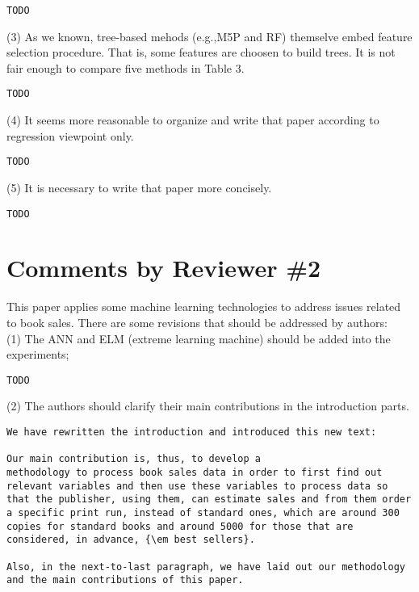 \documentclass[preprint]{elsarticle}
\begin{document}
\begin{verbatim}
TODO
\end{verbatim}

\noindent (3) As we known, tree-based mehods (e.g.,M5P and RF) themselve embed feature selection procedure. That is, some features are choosen to build trees. It is not fair enough to compare five methods in Table 3. \\

\begin{verbatim}
TODO
\end{verbatim}

\noindent (4) It seems more reasonable to organize and write that paper according to regression viewpoint only.\\

\begin{verbatim}
TODO
\end{verbatim}

\noindent (5) It is necessary to write that paper more concisely.\\

\begin{verbatim}
TODO
\end{verbatim}



\section{Comments by Reviewer \#2}

\noindent This paper applies some machine learning technologies to address issues related to book sales. There are some revisions that should be addressed by authors:\\


\noindent (1) The ANN and ELM (extreme learning machine) should be added into the experiments;\\

\begin{verbatim}
TODO
\end{verbatim}


\noindent (2) The authors should clarify their main contributions in the introduction parts.\\

\begin{verbatim}
We have rewritten the introduction and introduced this new text:

Our main contribution is, thus, to develop a
methodology to process book sales data in order to first find out
relevant variables and then use these variables to process data so
that the publisher, using them, can estimate sales and from them order
a specific print run, instead of standard ones, which are around 300
copies for standard books and around 5000 for those that are
considered, in advance, {\em best sellers}.

Also, in the next-to-last paragraph, we have laid out our methodology 
and the main contributions of this paper.

\end{verbatim}
\end{document}
